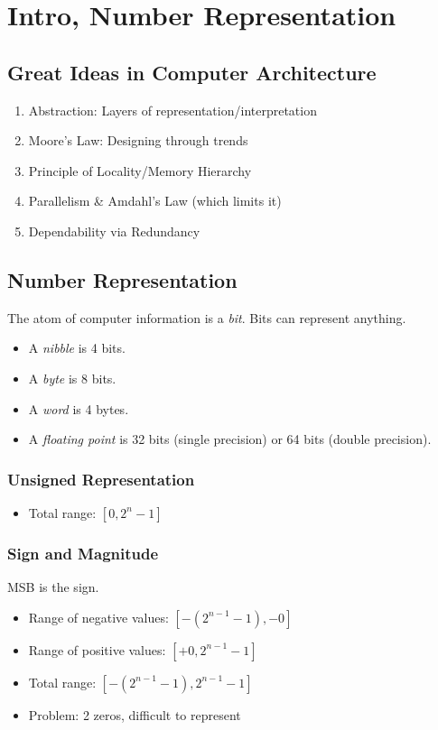 \chapter{Intro, Number Representation}

\section{Great Ideas in Computer Architecture}
\begin{enumerate}
    \item Abstraction: Layers of representation/interpretation
    \item Moore’s Law: Designing through trends
    \item Principle of Locality/Memory Hierarchy
    \item Parallelism \& Amdahl's Law (which limits it)
    \item Dependability via Redundancy
\end{enumerate}

\section{Number Representation}
The atom of computer information is a \emph{bit}. Bits can represent anything.
\begin{itemize}
    \item A \emph{nibble} is 4 bits.
    \item A \emph{byte} is 8 bits.
    \item A \emph{word} is 4 bytes.
    \item A \emph{floating point} is 32 bits (single precision) or 64 bits (double precision).
\end{itemize}

\subsection{Unsigned Representation}
\begin{itemize}
    \item Total range: \([0, 2^{n}-1]\)
\end{itemize}

\subsection{Sign and Magnitude}
MSB is the sign.
\begin{itemize}
	\item Range of negative values: \([-(2^{n-1}-1), -0]\)
	\item Range of positive values: \([+0, 2^{n-1}-1]\)
    \item Total range: \([-(2^{n-1}-1), 2^{n-1}-1]\)
    \item Problem: 2 zeros, difficult to represent
\end{itemize}
	
